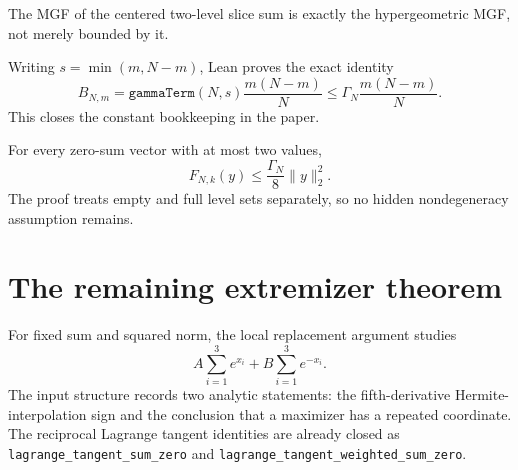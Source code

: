 \begin{lemma}
\label{lem:slice-hypergeom}
The MGF of the centered two-level slice sum is exactly the hypergeometric MGF,
not merely bounded by it.
\end{lemma}

\begin{lemma}
\label{lem:factor-match}
Writing \(s=\min(m,N-m)\), Lean proves the exact identity
\[
  B_{N,m}
  =\texttt{gammaTerm}(N,s)\frac{m(N-m)}N
  \le \Gamma_N\frac{m(N-m)}N.
\]
This closes the constant bookkeeping in the paper.
\end{lemma}

\begin{theorem}
\label{thm:two-level-slice}
For every zero-sum vector with at most two values,
\[
  F_{N,k}(y)\le\frac{\Gamma_N}{8}\|y\|_2^2.
\]
The proof treats empty and full level sets separately, so no hidden
nondegeneracy assumption remains.
\end{theorem}

\section{The remaining extremizer theorem}

\begin{definition}
For fixed sum and squared norm, the local replacement argument studies
\[
  A\sum_{i=1}^3e^{x_i}+B\sum_{i=1}^3e^{-x_i}.
\]
The input structure records two analytic statements: the fifth-derivative
Hermite-interpolation sign and the conclusion that a maximizer has a repeated
coordinate.  The reciprocal Lagrange tangent identities are already closed as
\texttt{lagrange\_tangent\_sum\_zero} and
\texttt{lagrange\_tangent\_weighted\_sum\_zero}.
\end{definition}

